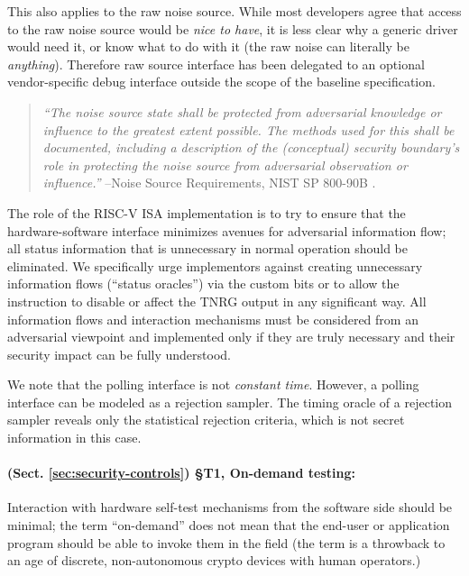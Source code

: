     This also applies to the raw noise source. While most developers agree
    that access to the raw noise source would be \emph{nice to have},
    it is less clear why a generic driver would need it, or know what to
    do with it (the raw noise can literally be \emph{anything}).
    Therefore raw source interface has been delegated to an optional
    vendor-specific debug interface outside the scope of the baseline
    specification.

    \begin{quote}
    {\it ``The noise source state shall be protected from adversarial
        knowledge or influence to the greatest extent possible. The methods
        used for this shall be documented, including a description of the
        (conceptual) security boundary’s role in protecting the noise source
        from adversarial observation or influence.''}
    \flushright --Noise Source Requirements, NIST SP 800-90B \cite{TuBaKe+18}.
    \end{quote}

    The role of the RISC-V ISA implementation is to try to ensure that the
    hardware-software interface minimizes avenues for adversarial information
    flow; all status information that is unnecessary in normal operation
    should be eliminated. We specifically urge implementors against creating
    unnecessary information flows (``status oracles'') via the custom bits
    or to allow the instruction to disable or affect the TNRG output in any
    significant way. All information flows and interaction mechanisms must
    be considered from an adversarial viewpoint and implemented only if they
    are truly necessary and their security impact can be fully understood.

    We note that the polling interface is not \emph{constant time}.
    However, a polling interface can be modeled as a rejection sampler.
    The timing oracle of a rejection sampler reveals only the statistical
    rejection criteria, which is not secret information in this case.


    \paragraph{(Sect. \ref{sec:security-controls}) \S T1, On-demand testing:}
    Interaction with hardware self-test mechanisms
    from the software side should be minimal; the term ``on-demand'' does not
    mean that the end-user or application program should be able to invoke
    them in the field (the term is a throwback to an age of discrete,
    non-autonomous crypto devices with human operators.)

